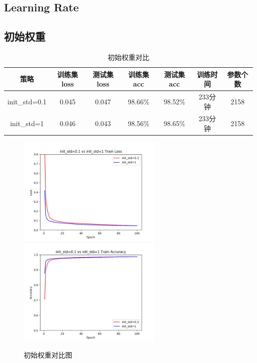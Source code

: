 \documentclass[11pt,utf8]{article}
\begin{document}
          \subsection*{Learning Rate}
            
          \subsection*{初始权重}
            \begin{table}[h]
              \centering
              \begin{tabular}{|c|c|c|c|c|c|c|}\hline
                策略&训练集loss&测试集loss&训练集acc&测试集acc&训练时间&参数个数\\\hline
                init\_std=0.1&0.045&0.047&98.66\%&98.52\%&233分钟&2158\\
                init\_std=1&0.046&0.043&98.56\%&98.65\%&233分钟&2158\\\hline
              \end{tabular}
              \caption{初始权重对比}
              \label{tab:Margin_settings}
            \end{table}
            \begin{figure}
              \begin{center}
                \includegraphics[width=7cm]{result/init_std=0.1vsinit_std=1_loss.png}
                \includegraphics[width=7cm]{result/init_std=0.1vsinit_std=1_acc.png}\\
                \caption{初始权重对比图}
              \end{center}
            \end{figure}
          
\end{document}
